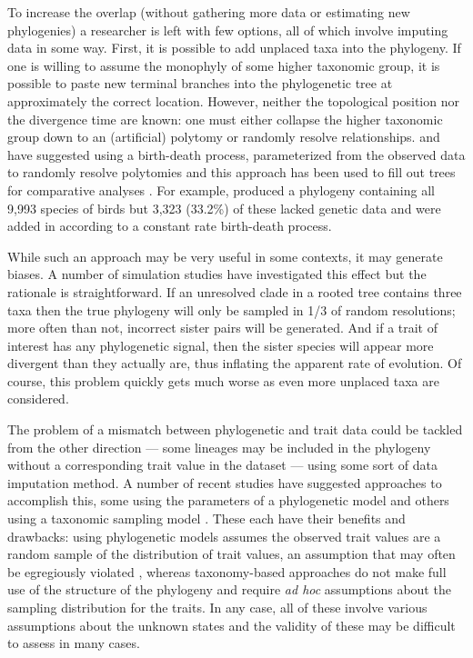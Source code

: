 \documentclass[a4paper,11pt]{article}
\begin{document}
To increase the overlap (without gathering more data or estimating new phylogenies) a researcher is left with few options, all of which involve imputing data in some way. First, it is possible to add unplaced taxa into the phylogeny. If one is willing to assume the monophyly of some higher taxonomic group, it is possible to paste new terminal branches into the phylogenetic tree at approximately the correct location. However, neither the topological position nor the divergence time are known: one must either collapse the higher taxonomic group down to an (artificial) polytomy or randomly resolve relationships. \citet{Kuhn2011} and \citet{ThomasPastis} have suggested using a birth-death process, parameterized from the observed data to randomly resolve polytomies \citep[see also][for a related approach for fossil trees]{Bapst2013} and this approach has been used to fill out trees for comparative analyses \citep{Jetz2012, Price2012, Rolland2014, Jetz2014}. For example, \citet{Jetz2012} produced a phylogeny containing all 9,993 species of birds but 3,323 (33.2\%) of these lacked genetic data and were added in according to a constant rate birth-death process.

While such an approach may be very useful in some contexts, it may generate biases. A number of simulation studies have investigated this effect \citep{Losos1994, Martins1996, Davies2012, Bapst2014, Rabosky2015} but the rationale is straightforward. If an unresolved clade in a rooted tree contains three taxa then the true phylogeny will only be sampled in 1/3 of random resolutions; more often than not, incorrect sister pairs will be generated. And if a trait of interest has any phylogenetic signal, then the sister species will appear more divergent than they actually are, thus inflating the apparent rate of evolution. Of course, this problem quickly gets much worse as even more unplaced taxa are considered.

The problem of a mismatch between phylogenetic and trait data could be tackled from the other direction --- some lineages may be included in the phylogeny without a corresponding trait value in the dataset --- using some sort of data imputation method. A number of recent studies have suggested approaches to accomplish this, some using the parameters of a phylogenetic model \citep{Garland2000, phylopars, Fagan2013, PEM, Swenson2014, Jetz2015} and others using a taxonomic sampling model \citep{Ogle2013, FitzJohn2014, Sandel2015, Schrodt2015}. These each have their benefits and drawbacks: using phylogenetic models assumes the observed trait values are a random sample of the distribution of trait values, an assumption that may often be egregiously violated \citep{FitzJohn2014}, whereas taxonomy-based approaches do not make full use of the structure of the phylogeny and require \emph{ad hoc} assumptions about the sampling distribution for the traits. In any case, all of these involve various assumptions about the unknown states and the validity of these may be difficult to assess in many cases.
\end{document}
